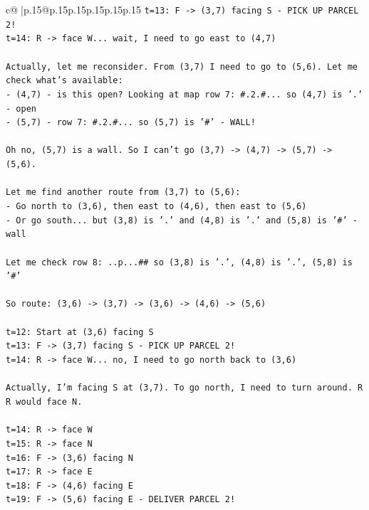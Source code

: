 \documentclass{article}
\begin{document}
{\begin{supertabular}{c@{$\;$}|p{.15\linewidth}@{}p{.15\linewidth}p{.15\linewidth}p{.15\linewidth}p{.15\linewidth}p{.15\linewidth}}
{{{\texttt{t=13: F {-}> (3,7) facing S {-} PICK UP PARCEL 2!} \\
\texttt{t=14: R {-}> face W... wait, I need to go east to (4,7)} \\
\\ 
\texttt{Actually, let me reconsider. From (3,7) I need to go to (5,6). Let me check what's available:} \\
\texttt{{-} (4,7) {-} is this open? Looking at map row 7: \#.2.\#... so (4,7) is '.' {-} open} \\
\texttt{{-} (5,7) {-} row 7: \#.2.\#... so (5,7) is '\#' {-} WALL!} \\
\\ 
\texttt{Oh no, (5,7) is a wall. So I can't go (3,7) {-}> (4,7) {-}> (5,7) {-}> (5,6).} \\
\\ 
\texttt{Let me find another route from (3,7) to (5,6):} \\
\texttt{{-} Go north to (3,6), then east to (4,6), then east to (5,6)} \\
\texttt{{-} Or go south... but (3,8) is '.' and (4,8) is '.' and (5,8) is '\#' {-} wall} \\
\\ 
\texttt{Let me check row 8: ..p...\#\# so (3,8) is '.', (4,8) is '.', (5,8) is '\#'} \\
\\ 
\texttt{So route: (3,6) {-}> (3,7) {-}> (3,6) {-}> (4,6) {-}> (5,6)} \\
\\ 
\texttt{t=12: Start at (3,6) facing S} \\
\texttt{t=13: F {-}> (3,7) facing S {-} PICK UP PARCEL 2!} \\
\texttt{t=14: R {-}> face W... no, I need to go north back to (3,6)} \\
\\ 
\texttt{Actually, I'm facing S at (3,7). To go north, I need to turn around. R R would face N.} \\
\\ 
\texttt{t=14: R {-}> face W} \\
\texttt{t=15: R {-}> face N} \\
\texttt{t=16: F {-}> (3,6) facing N} \\
\texttt{t=17: R {-}> face E} \\
\texttt{t=18: F {-}> (4,6) facing E} \\
\texttt{t=19: F {-}> (5,6) facing E {-} DELIVER PARCEL 2!} \\
\\ 
}}}
\end{supertabular}}
\end{document}
